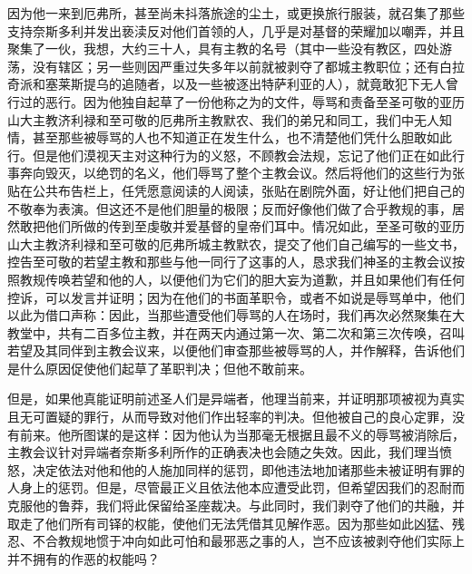 因为他一来到厄弗所，甚至尚未抖落旅途的尘土，或更换旅行服装，就召集了那些支持奈斯多利并发出亵渎反对他们首领的人，几乎是对基督的荣耀加以嘲弄，并且聚集了一伙，我想，大约三十人，具有主教的名号（其中一些没有教区，四处游荡，没有辖区；另一些则因严重过失多年以前就被剥夺了都城主教职位；还有白拉奇派和塞莱斯提乌的追随者，以及一些被逐出特萨利亚的人），就竟敢犯下无人曾行过的恶行。因为他独自起草了一份他称之为的文件，辱骂和责备至圣可敬的亚历山大主教济利禄和至可敬的厄弗所主教默农、我们的弟兄和同工，我们中无人知情，甚至那些被辱骂的人也不知道正在发生什么，也不清楚他们凭什么胆敢如此行。但是他们漠视天主对这种行为的义怒，不顾教会法规，忘记了他们正在如此行事奔向毁灭，以绝罚的名义，他们辱骂了整个主教会议。然后将他们的这些行为张贴在公共布告栏上，任凭愿意阅读的人阅读，张贴在剧院外面，好让他们把自己的不敬奉为表演。但这还不是他们胆量的极限；反而好像他们做了合乎教规的事，居然敢把他们所做的传到至虔敬并爱基督的皇帝们耳中。情况如此，至圣可敬的亚历山大主教济利禄和至可敬的厄弗所城主教默农，提交了他们自己编写的一些文书，控告至可敬的若望主教和那些与他一同行了这事的人，恳求我们神圣的主教会议按照教规传唤若望和他的人，以便他们为它们的胆大妄为道歉，并且如果他们有任何控诉，可以发言并证明；因为在他们的书面革职令，或者不如说是辱骂单中，他们以此为借口声称：因此，当那些遭受他们辱骂的人在场时，我们再次必然聚集在大教堂中，共有二百多位主教，并在两天内通过第一次、第二次和第三次传唤，召叫若望及其同伴到主教会议来，以便他们审查那些被辱骂的人，并作解释，告诉他们是什么原因促使他们起草了革职判决；但他不敢前来。\par

但是，如果他真能证明前述圣人们是异端者，他理当前来，并证明那项被视为真实且无可置疑的罪行，从而导致对他们作出轻率的判决。但他被自己的良心定罪，没有前来。他所图谋的是这样：因为他认为当那毫无根据且最不义的辱骂被消除后，主教会议针对异端者奈斯多利所作的正确表决也会随之失效。因此，我们理当愤怒，决定依法对他和他的人施加同样的惩罚，即他违法地加诸那些未被证明有罪的人身上的惩罚。但是，尽管最正义且依法他本应遭受此罚，但希望因我们的忍耐而克服他的鲁莽，我们将此保留给圣座裁决。与此同时，我们剥夺了他们的共融，并取走了他们所有司铎的权能，使他们无法凭借其见解作恶。因为那些如此凶猛、残忍、不合教规地惯于冲向如此可怕和最邪恶之事的人，岂不应该被剥夺他们实际上并不拥有的作恶的权能吗？\par

